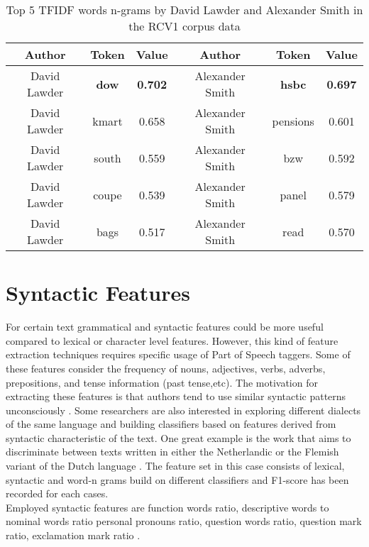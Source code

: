 \begin{table}[h!]
	\begin{center}  
		\caption[Top 5 TFIDF n-grams in RCV1 corpus]{Top 5 TFIDF words n-grams by David Lawder and Alexander Smith in the RCV1 corpus data} 
		\label{tab:tableTFIDFRCV1}
		\begin{tabular}{|c | c | c || c | c | c |}
			\hline 
			Author & Token & Value & Author & Token & Value \\
			\hline \hline
			David Lawder & \textbf{dow} & \textbf{0.702} & Alexander Smith & \textbf{hsbc} & \textbf{0.697} \\ \hline
			David Lawder & kmart & 0.658	& Alexander Smith & pensions & 0.601  \\ \hline
			David Lawder & south & 0.559	& Alexander Smith & bzw & 0.592 \\ \hline
			David Lawder & coupe & 0.539 & Alexander Smith & panel & 0.579 \\ \hline
			David Lawder & bags & 0.517 & Alexander Smith & read & 0.570 \\ \hline
		\end{tabular} 
	\end{center}
\end{table}


\section{Syntactic Features}

For certain text grammatical and syntactic features could be more useful compared to lexical or character level features. However, this kind of feature extraction techniques requires specific usage of Part of Speech taggers. Some of these features consider the frequency of nouns, adjectives, verbs, adverbs, prepositions, and tense information (past tense,etc). The motivation for extracting these features is that authors tend to use similar syntactic patterns unconsciously \cite{stamatatos2009survey}.
Some researchers are also interested in exploring different dialects of the same language and building classifiers based on features derived from syntactic characteristic of the text. One great example is the work that aims to discriminate between texts written in either the Netherlandic or the Flemish variant of the Dutch language \cite{van2017exploring}.
The feature set in this case consists of lexical, syntactic and word-n grams build on different classifiers and F1-score has been recorded for each cases.\\
Employed syntactic features are function words ratio, descriptive words to nominal words ratio personal pronouns ratio, question words ratio, question mark ratio, exclamation
mark ratio \cite{van2017exploring}.

